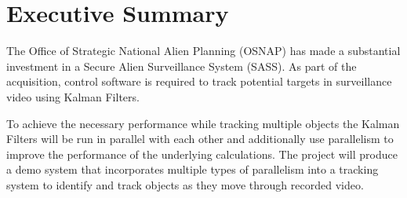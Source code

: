 \chapter*{Executive Summary}
The Office of Strategic National Alien Planning (OSNAP) has made a substantial investment in a Secure Alien Surveillance System (SASS). As part of the acquisition, control software is required to track potential targets in surveillance video using Kalman Filters.

To achieve the necessary performance while tracking multiple objects the Kalman Filters will be run in parallel with each other and additionally use parallelism to improve the performance of the underlying calculations. The project will produce a demo system that incorporates multiple types of parallelism into a tracking system to identify and track objects as they move through recorded video.